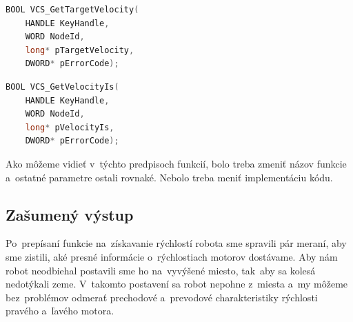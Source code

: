 \label{VelocityIs}
\begin{lstlisting}[language=C++]
BOOL VCS_GetTargetVelocity(
	HANDLE KeyHandle,
	WORD NodeId,
	long* pTargetVelocity,
	DWORD* pErrorCode);
\end{lstlisting}

\begin{lstlisting}[language=C++]
BOOL VCS_GetVelocityIs(
	HANDLE KeyHandle,
	WORD NodeId,
	long* pVelocityIs,
	DWORD* pErrorCode);
\end{lstlisting}

\noindent Ako môžeme vidieť v~týchto predpisoch funkcií, bolo treba zmeniť názov funkcie a~ostatné parametre ostali rovnaké.
Nebolo treba meniť implementáciu kódu.

\subsection{Zašumený výstup}
\label{subsec:outputNoice}

Po~prepísaní funkcie na~získavanie rýchlostí robota sme spravili pár meraní, aby sme zistili, aké presné informácie o~rýchlostiach
motorov dostávame. Aby nám robot neodbiehal postavili sme ho na~vyvýšené miesto, tak~aby sa kolesá nedotýkali zeme. V~takomto
postavení sa robot nepohne z~miesta a~my môžeme bez~problémov odmerať prechodové a~prevodové charakteristiky rýchlosti pravého
a~ľavého motora.


